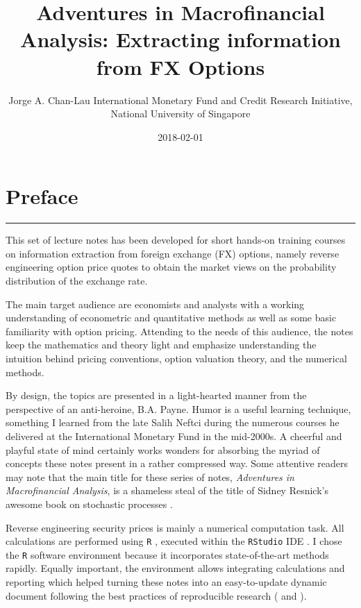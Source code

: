 \documentclass[]{book}
\title{Adventures in Macrofinancial Analysis: Extracting information from FX
Options}
\author{Jorge A. Chan-Lau International Monetary Fund and Credit Research
Initiative, National University of Singapore}
\date{2018-02-01}
\theoremstyle{definition}
\theoremstyle{definition}
\theoremstyle{definition}
\theoremstyle{remark}
\begin{document}
\maketitle

{
\setcounter{tocdepth}{1}
\tableofcontents
}
\chapter*{Preface}\label{preface}

\begin{center}\rule{0.5\linewidth}{\linethickness}\end{center}

This set of lecture notes has been developed for short hands-on training
courses on information extraction from foreign exchange (FX) options,
namely reverse engineering option price quotes to obtain the market
views on the probability distribution of the exchange rate.

The main target audience are economists and analysts with a working
understanding of econometric and quantitative methods as well as some
basic familiarity with option pricing. Attending to the needs of this
audience, the notes keep the mathematics and theory light and emphasize
understanding the intuition behind pricing conventions, option valuation
theory, and the numerical methods.

By design, the topics are presented in a light-hearted manner from the
perspective of an anti-heroine, B.A. Payne. Humor is a useful learning
technique, something I learned from the late Salih Neftci during the
numerous courses he delivered at the International Monetary Fund in the
mid-2000s. A cheerful and playful state of mind certainly works wonders
for absorbing the myriad of concepts these notes present in a rather
compressed way. Some attentive readers may note that the main title for
these series of notes, \emph{Adventures in Macrofinancial Analysis}, is
a shameless steal of the title of Sidney Resnick's awesome book on
stochastic processes \citep{Resnick1992}.

Reverse engineering security prices is mainly a numerical computation
task. All calculations are performed using \texttt{R} \citep{R-base},
executed within the \texttt{RStudio} IDE \citep{R-RStudio}. I chose the
\texttt{R} software environment because it incorporates state-of-the-art
methods rapidly. Equally important, the environment allows integrating
calculations and reporting which helped turning these notes into an
easy-to-update dynamic document following the best practices of
reproducible research (\citet{xie2015} and \citet{Gandrud2015}).
\end{document}

